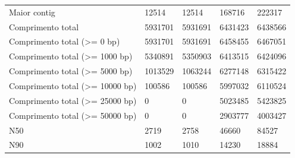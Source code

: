 \begin{table}[htb]
{\begin{tabular}{lllll}
		Maior contig                                 & 12514                                  & 12514                                   & 168716                            & 222317                                                           \\
		Comprimento total                            & 5931701                                & 5931691                                 & 6431423                           & 6438566                                                      \\
		Comprimento total (\textgreater{}= 0 bp)     & 5931701                                & 5931691                                 & 6458455                           & 6467051                                                      \\
		Comprimento total (\textgreater{}= 1000 bp)  & 5340891                                & 5350903                                 & 6413515                           & 6424096                                                    \\
		Comprimento total (\textgreater{}= 5000 bp)  & 1013529                                & 1063244                                 & 6277148                           & 6315422                                                      \\
		Comprimento total (\textgreater{}= 10000 bp) & 100586                                 & 100586                                  & 5997032                           & 6110524                                                       \\
		Comprimento total (\textgreater{}= 25000 bp) & 0                                      & 0                                       & 5023485                           & 5423825                                                  \\
		Comprimento total (\textgreater{}= 50000 bp) & 0                                      & 0                                       & 2903777                           & 4003427                                                              \\
		N50                                          & 2719                                   & 2758                                    & 46660                             & 84527                                            \\
		N90                                          & 1002                                   & 1010                                    & 14230                             & 18884                                                   \\

\end{tabular}}
\end{table}
